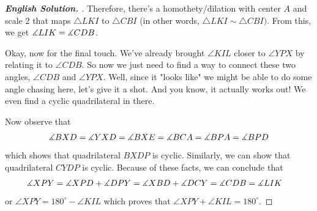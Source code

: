 \begin{proof}[\textbf{English Solution. }]
Therefore, there's a homothety/dilation with center $A$ and scale 2 that maps $\triangle LKI$ to $\triangle CBI$ (in other words, $\triangle LKI \sim \triangle CBI)$. From this, we get $\measuredangle LIK = \measuredangle CDB$. 
\begin{remark*}
    Okay, now for the final touch. We've already brought $\angle KIL$ closer to $\angle YPX$ by relating it to $\angle CDB$. So now we just need to find a way to connect these two angles, $\angle CDB$ and $\angle YPX$. Well, since it "looks like" we might be able to do some angle chasing here, let's give it a shot. And you know, it actually works out! We even find a cyclic quadrilateral in there.
\end{remark*}
Now observe that
\begin{align*}
    \measuredangle BXD = \measuredangle YXD = \measuredangle BXE = \measuredangle BCA = \measuredangle BPA = \measuredangle BPD
\end{align*}
which shows that quadrilateral $BXDP$ is cyclic. Similarly, we can show that quadrilateral $CYDP$ is cyclic. Because of these facts, we can conclude that
\begin{align*}
    \measuredangle XPY &= \measuredangle XPD + \measuredangle DPY = \measuredangle XBD +\measuredangle DCY = \measuredangle CDB = \measuredangle LIK
\end{align*}
or $\angle XPY = 180^\circ - \angle KIL$ which proves that $\angle XPY + \angle KIL = 180^\circ$.
\end{proof}